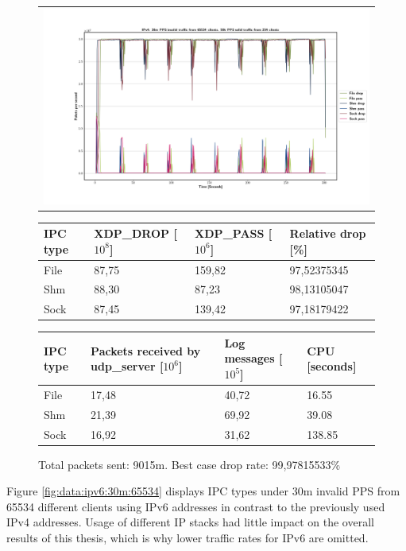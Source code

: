 \begin{figure}[!h]
	\centering
	\scriptsize
	\begin{tabular}{c}
    	\centerline{\includegraphics[width=1.2\textwidth]{images/IPv4_30m_65534_1.png}}
	\end{tabular}
	\begin{tabular}{llll}
		\toprule
		\textbf{IPC type} & \textbf{XDP\_DROP [$10^8$]} & \textbf{XDP\_PASS [$10^6$]} & \textbf{Relative drop [\%]}\\ \midrule 
		File & 87,75 & 159,82 & 97,52375345 \\
        Shm & 88,30 & 87,23 & 98,13105047 \\
        Sock & 87,45 & 139,42 & 97,18179422 \\
	\bottomrule
	\end{tabular}
    \begin{tabular}{llll}
		\toprule
		\textbf{IPC type} & \textbf{Packets received by udp\_server [$10^6$]} & \textbf{Log messages [$10^5$]} & \textbf{CPU [seconds]} \\ \midrule 
		File & 17,48 & 40,72 & 16.55 \\
        Shm & 21,39 & 69,92 & 39.08 \\
        Sock & 16,92 & 31,62 & 138.85 \\
	\bottomrule
	\end{tabular}
	\caption[Simplefail2ban, IPv4, 30m \ac{PPS}, 65534 malicious clients]{Total packets sent: 9015m. Best case drop rate: 99,97815533\%}
	\label{fig:data:ipv4:30m:65534}
\end{figure}

Figure \ref{fig:data:ipv6:30m:65534} displays IPC types under 30m invalid PPS from 65534 different clients using IPv6 addresses in contrast to the previously used IPv4 addresses.
Usage of different IP stacks had little impact on the overall results of this thesis, which is why lower traffic rates for IPv6 are omitted.

